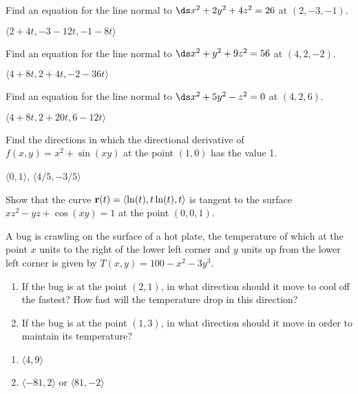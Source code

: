 \begin{enumialphparenastyle}
\begin{ex}
Find an equation for the line normal to 
$\ds x^2+2y^2+4z^2=26 $ at $(2,-3,-1)$.
\begin{sol}
$\langle 2+4t,-3-12t,-1-8t\rangle$
\end{sol}
\end{ex}

\begin{ex}
Find an equation for the line normal to 
$\ds x^2+y^2+9z^2=56$ at $(4,2,-2)$.
\begin{sol}
$\langle 4+8t,2+4t,-2-36t\rangle$
\end{sol}
\end{ex}

\begin{ex}
Find an equation for the line normal to 
$\ds x^2+5y^2-z^2=0$ at $(4,2,6)$.
\begin{sol}
$\langle 4+8t,2+20t,6-12t\rangle$
\end{sol}
\end{ex}

\begin{ex}
Find the directions in which the directional derivative of
$f(x,y)=x^2+\sin(xy)$ at the point $(1,0)$ has the value 1.
\begin{sol}
$\langle 0,1\rangle$, $\langle 4/5,-3/5\rangle$
\end{sol}
\end{ex}

\begin{ex}
Show that the curve 
${\bf r}(t) = \langle\ln(t),t\ln(t),t\rangle$
is tangent to the surface $xz^2-yz+\cos(xy) = 1$ at the point
$(0,0,1)$.
\end{ex}

\begin{ex}
A bug is crawling on the surface of a hot plate, the
temperature of which at the point $x$ units to the right of the lower
left corner and $y$ units up from the lower left corner is given by
$T(x,y)=100-x^2-3y^3$.

\begin{enumerate}
	\item If the bug is at the point $(2,1)$, in what direction should it
	  move to cool off the fastest?  How fast will the temperature drop in
	  this direction?
	\item If the bug is at the point $(1,3)$, in what direction should it
	  move in order to maintain its temperature?
\end{enumerate}
\begin{sol}
\begin{enumerate}
	\item	$\langle 4,9\rangle$
	\item	$\langle -81,2\rangle$ or $\langle 81,-2\rangle$
\end{enumerate}
\end{sol}
\end{ex}


\end{enumialphparenastyle}
